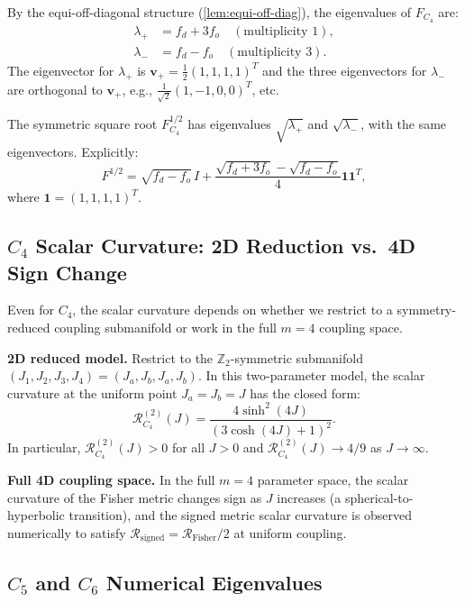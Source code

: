 \documentclass[11pt]{article}
\theoremstyle{definition}
\theoremstyle{remark}
\newcommand{\Fish}{F}
\newcommand{\Scal}{\mathcal{R}}
\begin{document}
By the equi-off-diagonal structure (\cref{lem:equi-off-diag}), the
eigenvalues of $\Fish_{C_4}$ are:
\begin{align}
  \lambda_+ &= f_d + 3 f_o \quad (\text{multiplicity } 1), \label{eq:c4-lam-plus}\\
  \lambda_- &= f_d - f_o \quad (\text{multiplicity } 3). \label{eq:c4-lam-minus}
\end{align}
The eigenvector for $\lambda_+$ is $\mathbf{v}_+ = \tfrac{1}{2}(1,1,1,1)^T$
and the three eigenvectors for $\lambda_-$ are orthogonal to $\mathbf{v}_+$,
e.g., $\tfrac{1}{\sqrt{2}}(1,-1,0,0)^T$, etc.

The symmetric square root $\Fish^{1/2}_{C_4}$ has eigenvalues
$\sqrt{\lambda_+}$ and $\sqrt{\lambda_-}$, with the same eigenvectors.
Explicitly:
\begin{equation}
  \Fish^{1/2} = \sqrt{f_d - f_o}\, I
    + \frac{\sqrt{f_d + 3 f_o} - \sqrt{f_d - f_o}}{4}
      \mathbf{1}\mathbf{1}^T,
  \label{eq:c4-sqrt}
\end{equation}
where $\mathbf{1} = (1,1,1,1)^T$.

\subsection{$C_4$ Scalar Curvature: 2D Reduction vs.\ 4D Sign Change}

Even for $C_4$, the scalar curvature depends on whether we restrict to a
symmetry-reduced coupling submanifold or work in the full $m=4$ coupling space.

\textbf{2D reduced model.}
Restrict to the $\mathbb{Z}_2$-symmetric submanifold
$(J_1,J_2,J_3,J_4)=(J_a,J_b,J_a,J_b)$. In this two-parameter model, the
scalar curvature at the uniform point $J_a=J_b=J$ has the closed form:
\begin{equation}
  \Scal_{C_4}^{(2)}(J) = \frac{4\sinh^2(4J)}{(3\cosh(4J)+1)^2}.
  \label{eq:c4-scalar-app}
\end{equation}
In particular, $\Scal_{C_4}^{(2)}(J)>0$ for all $J>0$ and
$\Scal_{C_4}^{(2)}(J)\to 4/9$ as $J\to\infty$.

\textbf{Full 4D coupling space.}
In the full $m=4$ parameter space, the scalar curvature of the Fisher metric
changes sign as $J$ increases (a spherical-to-hyperbolic transition), and the
signed metric scalar curvature is observed numerically to satisfy
$\Scal_{\text{signed}}=\Scal_{\text{Fisher}}/2$ at uniform coupling.

\subsection{$C_5$ and $C_6$ Numerical Eigenvalues}
\end{document}
